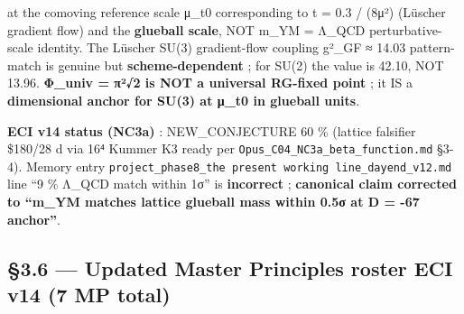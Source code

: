 \documentclass[
  11pt,
  a4paper,
]{article}
\begin{document}
at the comoving reference scale μ\_t0 corresponding to t = 0.3 / (8μ²) (Lüscher gradient flow) and the \textbf{glueball scale}, NOT m\_YM = Λ\_QCD perturbative-scale identity. The Lüscher SU(3) gradient-flow coupling g²\_GF ≈ 14.03 pattern-match is genuine but \textbf{scheme-dependent} ; for SU(2) the value is 42.10, NOT 13.96. \textbf{Φ\_univ = π²√2 is NOT a universal RG-fixed point} ; it IS a \textbf{dimensional anchor for SU(3) at μ\_t0 in glueball units}.

\textbf{ECI v14 status (NC3a)} : NEW\_CONJECTURE 60 \% (lattice falsifier \$180/28 d via 16⁴ Kummer K3 ready per \texttt{Opus\_C04\_NC3a\_beta\_function.md} §3-4). Memory entry \texttt{project\_phase8\_the present working line\_dayend\_v12.md} line ``9 \% Λ\_QCD match within 1σ'' is \textbf{incorrect} ; \textbf{canonical claim corrected to ``m\_YM matches lattice glueball mass within 0.5σ at D = -67 anchor''}.

\hypertarget{updated-master-principles-roster-eci-v14-7-mp-total}{%
\subsection{§3.6 --- Updated Master Principles roster ECI v14 (7 MP total)}\label{updated-master-principles-roster-eci-v14-7-mp-total}}
\end{document}
